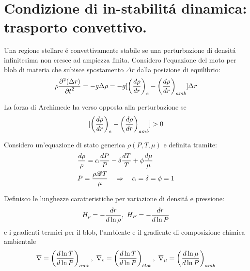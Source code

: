 \documentclass[../main.tex]{subfiles}
\begin{document}
\section{Condizione di in-stabilit\'a dinamica: trasporto convettivo.}

Una regione stellare \'e convettivamente stabile se una perturbazione di densit\'a infinitesima non cresce ad ampiezza finita. Considero l'equazione del moto per blob di materia che subisce spostamento $\Delta r$ dalla  posizione di equilibrio:
\begin{equation}\label{eq:buoyancyEOM}
\rho\PtwoDy{t}{(\Delta r)}=-g\Delta\rho=-g[\Dcvar{\TDy{r}{\rho}}{e}-\Dcvar{\TDy{r}{\rho}}{amb}]\Delta r
\end{equation}

La forza di Archimede ha verso opposta alla perturbazione se
\begin{equation}\label{eq:Acriterion}
[\Dcvar{\TDy{r}{\rho}}{e}-\Dcvar{\TDy{r}{\rho}}{amb}]>0
\end{equation}

Considero un'equazione di stato generica $\rho(P,T,\mu)$ e definita tramite:
\begin{align}
&\frac{d\rho}{\rho}=\alpha\frac{dP}{P}-\delta\frac{dT}{T}+\phi\frac{d\mu}{\mu}\label{eq:deltatherm}\\
&P=\frac{\rho\gasconstant{}T}{\mu}\quad\Rightarrow\quad\alpha=\delta=\phi=1
\end{align}

Definisco le lunghezze caratteristiche per variazione di densit\'a e pressione:
\begin{equation}
\densityscale{}=-\frac{dr}{d\ln{\rho}},\ H_P=-\frac{dr}{d\ln{P}}
\end{equation}
e i gradienti termici per il blob, l'ambiente e il gradiente di composizione chimica ambientale
\begin{equation}
\nabla=\Dcvar{\TDly{P}{T}}{amb},\ \nabla_e=\Dcvar{\TDly{P}{T}}{blob},\ \nmu{}=\Dcvar{\TDly{P}{\mu}}{amb}\label{eq:nablavitense}
\end{equation}
\end{document}
